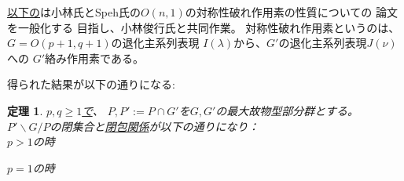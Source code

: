 \documentclass[a4paper,10pt]{article} %
\newcommand{\assign}{:=}
\newtheorem{theorem}{定理}
\begin{document}
\uline{以下の}は小林氏とSpeh氏の$O(n,1)$の対称性破れ作用素の性質についての
論文\cite{kobayashi2015symmetry}を一般化する
目指し、小林俊行氏と共同作業。
対称性破れ作用素というのは、$G=O(p+1,q+1)$の退化主系列表現
$I(\lambda)$から、$G'$の退化主系列表現$J(\nu)$への
$G'$絡み作用素である。

得られた結果が以下の通りになる:

\begin{theorem}
$p, q \geqslant 1$\uline{で}、 $P,P':=P\cap G'$を$G,G'$の最大故物型部分群とする。
  $P'\backslash G/P$の閉集合と\uline{閉包関係}が以下の通りになり：\\
  $p>1$の時
  \begin{figure}[H]\centerline{}\end{figure}
  $p=1$の時
  \begin{figure}[H]\centerline{}\end{figure}
\end{theorem}
\end{document}

